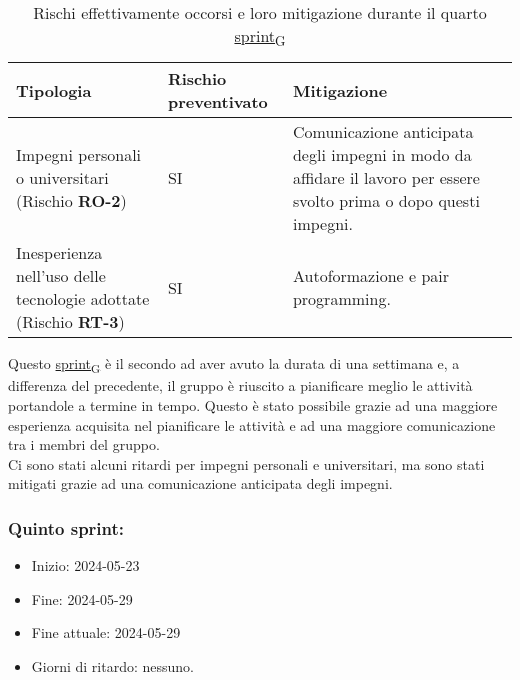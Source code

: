 \begin{table}[!h]
	\centering
	\begin{tabular}{ | p{6cm} | p{2.5cm} | p{7.5cm} | }
		\hline
		\textbf{Tipologia}                                                      & \textbf{Rischio preventivato} & \textbf{Mitigazione}                                                                                                \\
		\hline
		Impegni personali o universitari (Rischio \textbf{RO-2})                & SI                            & Comunicazione anticipata degli impegni in modo da affidare il lavoro per essere svolto prima o dopo questi impegni. \\
		\hline
		Inesperienza nell'uso delle tecnologie adottate (Rischio \textbf{RT-3}) & SI                            & Autoformazione e pair programming.                                                                                  \\
		\hline
	\end{tabular}
	\caption{Rischi effettivamente occorsi e loro mitigazione durante il quarto \href{https://7last.github.io/docs/rtb/documentazione-interna/glossario\#sprint}{sprint\textsubscript{G}}}
	
\end{table}
\newpage
{}
Questo \href{https://7last.github.io/docs/rtb/documentazione-interna/glossario\#sprint}{sprint\textsubscript{G}} è il secondo ad aver avuto la durata di una settimana e, a differenza del precedente, il gruppo è riuscito
a pianificare meglio le attività portandole a termine in tempo.
Questo è stato possibile grazie ad una maggiore esperienza acquisita nel pianificare le attività e ad una maggiore
comunicazione tra i membri del gruppo.\\
Ci sono stati alcuni ritardi per impegni personali e universitari, ma sono stati mitigati grazie ad una comunicazione
anticipata degli impegni.

\subsubsection{Quinto sprint:} 
\begin{itemize}
    \item Inizio: 2024-05-23
    \item Fine: 2024-05-29 
    \item Fine attuale: 2024-05-29  %
	\item Giorni di ritardo: nessuno.
\end{itemize}

